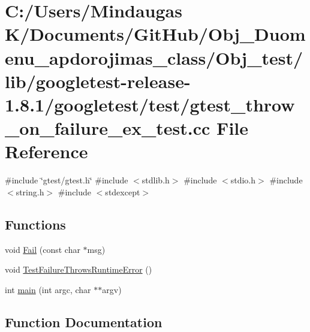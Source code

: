 \hypertarget{_obj__test_2lib_2googletest-release-1_88_81_2googletest_2test_2gtest__throw__on__failure__ex__test_8cc}{}\section{C\+:/\+Users/\+Mindaugas K/\+Documents/\+Git\+Hub/\+Obj\+\_\+\+Duomenu\+\_\+apdorojimas\+\_\+class/\+Obj\+\_\+test/lib/googletest-\/release-\/1.8.1/googletest/test/gtest\+\_\+throw\+\_\+on\+\_\+failure\+\_\+ex\+\_\+test.cc File Reference}
\label{_obj__test_2lib_2googletest-release-1_88_81_2googletest_2test_2gtest__throw__on__failure__ex__test_8cc}
{\ttfamily \#include \char`\"{}gtest/gtest.\+h\char`\"{}}\newline
{\ttfamily \#include $<$stdlib.\+h$>$}\newline
{\ttfamily \#include $<$stdio.\+h$>$}\newline
{\ttfamily \#include $<$string.\+h$>$}\newline
{\ttfamily \#include $<$stdexcept$>$}\newline
\subsection*{Functions}
\begin{DoxyCompactItemize}
\item 
void \mbox{\hyperlink{_obj__test_2lib_2googletest-release-1_88_81_2googletest_2test_2gtest__throw__on__failure__ex__test_8cc_a78ecbe7682643ac0413d57d0b9f27fa6}{Fail}} (const char $\ast$msg)
\item 
void \mbox{\hyperlink{_obj__test_2lib_2googletest-release-1_88_81_2googletest_2test_2gtest__throw__on__failure__ex__test_8cc_a3ddff869a4b3365dd7a9c3727b996a1d}{Test\+Failure\+Throws\+Runtime\+Error}} ()
\item 
int \mbox{\hyperlink{_obj__test_2lib_2googletest-release-1_88_81_2googletest_2test_2gtest__throw__on__failure__ex__test_8cc_a3c04138a5bfe5d72780bb7e82a18e627}{main}} (int argc, char $\ast$$\ast$argv)
\end{DoxyCompactItemize}


\subsection{Function Documentation}
\mbox{\label{_obj__test_2lib_2googletest-release-1_88_81_2googletest_2test_2gtest__throw__on__failure__ex__test_8cc_a78ecbe7682643ac0413d57d0b9f27fa6}} 
